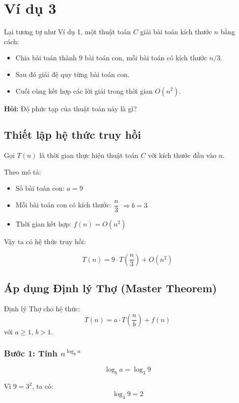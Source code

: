 \documentclass{article}
\begin{document}
\section{Ví dụ 3}

Lại tương tự như Ví dụ 1, một thuật toán \(C\) giải bài toán kích thước \(n\) bằng cách:
\begin{itemize}
    \item Chia bài toán thành \(9\) bài toán con, mỗi bài toán có kích thước \(n/3\).
    \item Sau đó giải đệ quy từng bài toán con.
    \item Cuối cùng kết hợp các lời giải trong thời gian \(O(n^2)\).
\end{itemize}

\textbf{Hỏi:} Độ phức tạp của thuật toán này là gì?

\subsection{Thiết lập hệ thức truy hồi}

Gọi \(T(n)\) là thời gian thực hiện thuật toán \(C\) với kích thước đầu vào \(n\).

Theo mô tả:
\begin{itemize}
    \item Số bài toán con: \(a = 9\)
    \item Mỗi bài toán con có kích thước: \(\dfrac{n}{3}\) \(\Rightarrow b = 3\)
    \item Thời gian kết hợp: \(f(n) = O(n^2)\)
\end{itemize}

Vậy ta có hệ thức truy hồi:

\[
\boxed{T(n) = 9 \cdot T\left(\frac{n}{3}\right) + O(n^2)}
\]

\subsection{Áp dụng Định lý Thợ (Master Theorem)}

Định lý Thợ cho hệ thức:
\[
T(n) = a \cdot T\left(\frac{n}{b}\right) + f(n)
\]
với \(a \ge 1\), \(b > 1\).

\subsubsection{Bước 1: Tính \(n^{\log_b a}\)}

\[
\log_b a = \log_3 9
\]

Vì \(9 = 3^2\), ta có:
\[
\log_3 9 = 2
\]
\end{document}
